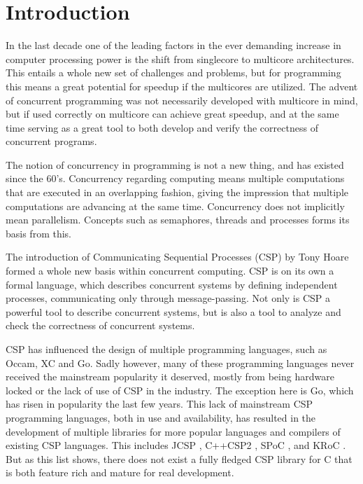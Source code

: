 
\chapter{Introduction}
\label{ch:introduction}

In the last decade one of the leading factors in the ever demanding increase in computer processing power is the shift from singlecore to multicore architectures. This entails a whole new set of challenges and problems, but for programming this means a great potential for speedup if the multicores are utilized. The advent of concurrent programming was not necessarily developed with multicore in mind, but if used correctly on multicore can achieve great speedup, and at the same time serving as a great tool to both develop and verify the correctness of concurrent programs. 

The notion of concurrency in programming is not a new thing, and has existed since the 60's. Concurrency regarding computing means multiple computations that are executed in an overlapping fashion, giving the impression that multiple computations are advancing at the same time. Concurrency does not implicitly mean parallelism. Concepts such as semaphores, threads and processes forms its basis from this. 

The introduction of Communicating Sequential Processes (CSP) by Tony Hoare \citep{csp} formed a whole new basis within concurrent computing. CSP is on its own a formal language, which describes concurrent systems by defining independent processes, communicating only through message-passing. Not only is CSP a powerful tool to describe concurrent systems, but is also a tool to analyze and check the correctness of concurrent systems. 

CSP has influenced the design of multiple programming languages, such as Occam, XC and Go. Sadly however, many of these programming languages never received the mainstream popularity it deserved, mostly from being hardware locked  or the lack of use of CSP in the industry. The exception here is Go, which has risen in popularity the last few years. This lack of mainstream CSP programming languages, both in use and availability, has resulted in the development of multiple libraries for more popular languages and compilers of existing CSP languages. This includes JCSP \citep{jcsp}, C++CSP2 \citep{c++csp2}, SPoC \citep{spoc}, and KRoC \citep{kroc}. But as this list shows, there does not exist a fully fledged CSP library for C that is both feature rich and mature for real development. 

